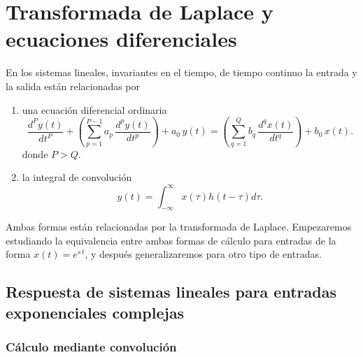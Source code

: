 \chapter{Transformada de Laplace y ecuaciones diferenciales}

En los sistemas lineales, invariantes en el tiempo, de tiempo continuo
la entrada y la salida est\'{a}n relacionadas por 

\begin{enumerate}
   \item   una ecuaci\'{o}n diferencial ordinaria 
      \begin{equation}
           \frac{d^{P}y\left( t\right) }{dt^{P}} +
           \left(\sum_{p=1}^{P-1}a_{p} \, \frac{d^{p}y\left( t\right) }{dt^{p}}\right) + 
           a_{0} \, y(t) =
           \left(\sum_{q=1}^{Q}b_{q} \, \frac{d^{q}x\left( t\right) }{dt^{q}}\right) + 
           b_{0} \, x(t).
      \end{equation}
      donde $P > Q$.
        
   \item   la integral de convoluci\'{o}n
      \begin{equation}
           y\left( t\right) = \int_{-\infty }^{\infty} x\left( \tau \right) h\left( t-\tau \right) d\tau.
      \end{equation}
\end{enumerate}
Ambas formas están relacionadas por la transformada de Laplace. Empezaremos estudiando la equivalencia entre ambas formas de cálculo para entradas de la forma $x(t) = e^{s \,  t}$, y despu\'{e}s generalizaremos para otro tipo de
entradas. 

\section{Respuesta de sistemas lineales para entradas exponenciales complejas}

\subsection{C\'{a}lculo mediante convoluci\'{o}n}

